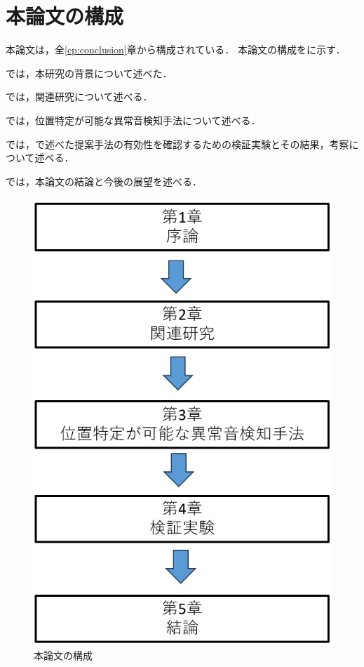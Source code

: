 \documentclass[../main]{subfiles}
\begin{document}
\section{本論文の構成}
\label{sec:configuration}
本論文は，全\ref{cp:conclusion}章から構成されている．
本論文の構成をに示す．

では，本研究の背景について述べた．

では，関連研究について述べる．

では，位置特定が可能な異常音検知手法について述べる．

では，で述べた提案手法の有効性を確認するための検証実験とその結果，考察について述べる．

では，本論文の結論と今後の展望を述べる．

\vspace{3\zh}
\begin{figure}[h]
  \centering
  \includegraphics[keepaspectratio, width=0.5\linewidth]{chap1/configuration.png}
  \caption{本論文の構成}
  \label{fig:configuration}
\end{figure}
\end{document}
